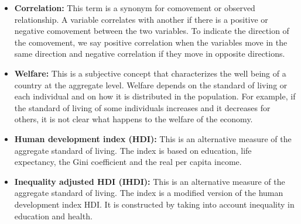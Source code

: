 \documentclass[letterpaper]{article}\usepackage[]{graphicx}\usepackage[]{color}
\numberwithin{exer}{section}
\theoremstyle{nonumberplain}
\begin{document}
\begin{itemize}
  standard of living may include, health, education, quality of air,
  freedom, security, income, etc. The real per capita GDP is often
  used as an indicator of the standard of living because it 
  correlated with its determinants.
\item \textbf{Correlation:} This term is a synonym for comovement or
  observed relationship. A variable correlates with another if there
  is a positive or negative comovement between the two variables. To
  indicate the direction of the comovement, we say positive
  correlation when the variables move in the same direction and
  negative correlation if they move in opposite directions.
\item \textbf{Welfare:} This is a subjective concept that
  characterizes the well being of a country at the aggregate
  level. Welfare depends on the standard of living or each individual
  and on how it is distributed in the population. For example, if the
  standard of living of some individuals increases and it decreases
  for others, it is not clear what happens to the welfare of the
  economy. 
\item \textbf{Human development index (HDI):} This is an alternative
  measure of the aggregate standard of living. The index is based on
  education, life expectancy, the Gini coefficient and the real per
  capita income.
\item \textbf{Inequality adjusted HDI (IHDI):} This is an alternative
  measure of the aggregate standard of living. The index is a modified
  version of the human development index HDI. It is constructed by
  taking into account inequality in education and health.
\end{itemize}
\end{document}
